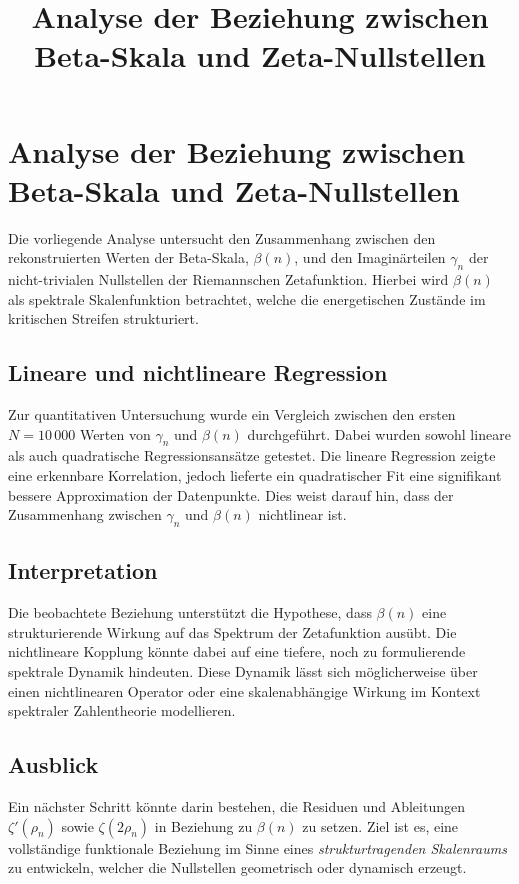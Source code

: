 \documentclass[a4paper,11pt]{article}
\title{Analyse der Beziehung zwischen Beta-Skala und Zeta-Nullstellen}
\author{}
\date{}
\begin{document}
\maketitle

\section*{Analyse der Beziehung zwischen Beta-Skala und Zeta-Nullstellen}

Die vorliegende Analyse untersucht den Zusammenhang zwischen den rekonstruierten Werten der Beta-Skala, $\beta(n)$, und den Imaginärteilen $\gamma_n$ der nicht-trivialen Nullstellen der Riemannschen Zetafunktion. Hierbei wird $\beta(n)$ als spektrale Skalenfunktion betrachtet, welche die energetischen Zustände im kritischen Streifen strukturiert.

\subsection*{Lineare und nichtlineare Regression}

Zur quantitativen Untersuchung wurde ein Vergleich zwischen den ersten $N = 10\,000$ Werten von $\gamma_n$ und $\beta(n)$ durchgeführt. Dabei wurden sowohl lineare als auch quadratische Regressionsansätze getestet. Die lineare Regression zeigte eine erkennbare Korrelation, jedoch lieferte ein quadratischer Fit eine signifikant bessere Approximation der Datenpunkte. Dies weist darauf hin, dass der Zusammenhang zwischen $\gamma_n$ und $\beta(n)$ nichtlinear ist.

\subsection*{Interpretation}

Die beobachtete Beziehung unterstützt die Hypothese, dass $\beta(n)$ eine strukturierende Wirkung auf das Spektrum der Zetafunktion ausübt. Die nichtlineare Kopplung könnte dabei auf eine tiefere, noch zu formulierende spektrale Dynamik hindeuten. Diese Dynamik lässt sich möglicherweise über einen nichtlinearen Operator oder eine skalenabhängige Wirkung im Kontext spektraler Zahlentheorie modellieren.

\subsection*{Ausblick}

Ein nächster Schritt könnte darin bestehen, die Residuen und Ableitungen $\zeta'(\rho_n)$ sowie $\zeta(2\rho_n)$ in Beziehung zu $\beta(n)$ zu setzen. Ziel ist es, eine vollständige funktionale Beziehung im Sinne eines \emph{strukturtragenden Skalenraums} zu entwickeln, welcher die Nullstellen geometrisch oder dynamisch erzeugt.
\end{document}
